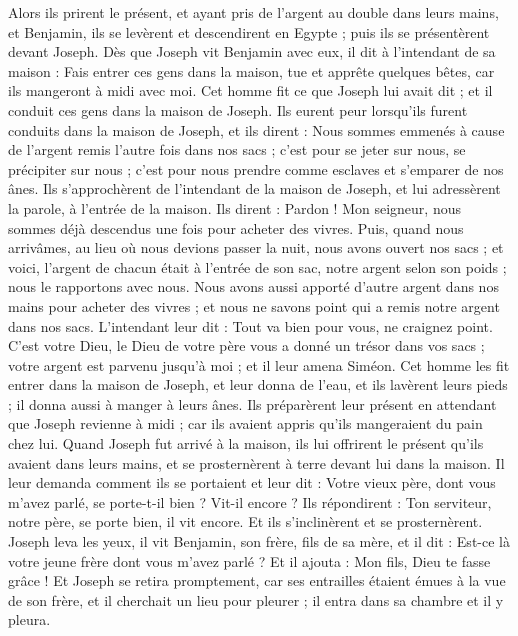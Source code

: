 \begin{multicols}{2}
Alors ils prirent le présent, et ayant pris de l'argent au double dans leurs mains, et Benjamin, ils se levèrent et descendirent en Egypte ; puis ils se présentèrent devant Joseph.
Dès que Joseph vit Benjamin avec eux, il dit à l'intendant de sa maison : Fais entrer ces gens dans la maison, tue et apprête quelques bêtes, car ils mangeront à midi avec moi.
Cet homme fit ce que Joseph lui avait dit ; et il conduit ces gens dans la maison de Joseph.
Ils eurent peur lorsqu'ils furent conduits dans la maison de Joseph, et ils dirent : Nous sommes emmenés à cause de l'argent remis l'autre fois dans nos sacs ; c'est pour se jeter sur nous, se précipiter sur nous ; c'est pour nous prendre comme esclaves et s'emparer de nos ânes.
Ils s'approchèrent de l'intendant de la maison de Joseph, et lui adressèrent la parole, à l'entrée de la maison.
Ils dirent : Pardon ! Mon seigneur, nous sommes déjà descendus une fois pour acheter des vivres.
Puis, quand nous arrivâmes, au lieu où nous devions passer la nuit, nous avons ouvert nos sacs ; et voici, l'argent de chacun était à l'entrée de son sac, notre argent selon son poids ; nous le rapportons avec nous.
Nous avons aussi apporté d'autre argent dans nos mains pour acheter des vivres ; et nous ne savons point qui a remis notre argent dans nos sacs.
L'intendant leur dit : Tout va bien pour vous, ne craignez point. C'est votre Dieu, le Dieu de votre père vous a donné un trésor dans vos sacs ; votre argent est parvenu jusqu'à moi ; et il leur amena Siméon.
Cet homme les fit entrer dans la maison de Joseph, et leur donna de l'eau, et ils lavèrent leurs pieds ; il donna aussi à manger à leurs ânes.
Ils préparèrent leur présent en attendant que Joseph revienne à midi ; car ils avaient appris qu'ils mangeraient du pain chez lui.
Quand Joseph fut arrivé à la maison, ils lui offrirent le présent qu'ils avaient dans leurs mains, et se prosternèrent à terre devant lui dans la maison.
Il leur demanda comment ils se portaient et leur dit : Votre vieux père, dont vous m'avez parlé, se porte-t-il bien ? Vit-il encore ?
Ils répondirent : Ton serviteur, notre père, se porte bien, il vit encore. Et ils s'inclinèrent et se prosternèrent.
Joseph leva les yeux, il vit Benjamin, son frère, fils de sa mère, et il dit : Est-ce là votre jeune frère dont vous m'avez parlé ? Et il ajouta : Mon fils, Dieu te fasse grâce !
Et Joseph se retira promptement, car ses entrailles étaient émues à la vue de son frère, et il cherchait un lieu pour pleurer ; il entra dans sa chambre et il y pleura.

\end{multicols}

